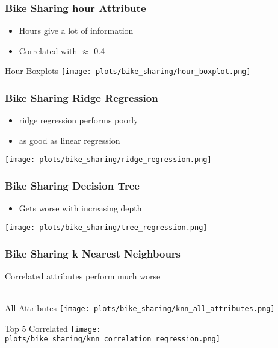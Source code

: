 \documentclass[aspectratio=169]{beamer}
\begin{document}
\begin{frame}
\frametitle{Bike Sharing hour Attribute}
\begin{minipage}{0.3\textwidth}
	\begin{itemize}
	\item Hours give a lot of information
	\item Correlated with $\approx$ 0.4
	\end{itemize}
\end{minipage}
\begin{minipage}{0.69\textwidth}
	\center Hour Boxplots
	\texttt{[image: plots/bike\_sharing/hour\_boxplot.png]}
\end{minipage}
\end{frame}

\begin{frame}{}
\frametitle{Bike Sharing Ridge Regression}
\begin{minipage}{0.3\textwidth}
\begin{itemize}
\item ridge regression performs poorly
\item as good as linear regression
\end{itemize}
\end{minipage}
\begin{minipage}{0.69\textwidth}
    \texttt{[image: plots/bike\_sharing/ridge\_regression.png]}
\end{minipage}
\end{frame}

\begin{frame}{}
\frametitle{Bike Sharing Decision Tree}
\begin{minipage}{0.3\textwidth}
\begin{itemize}
\item  Gets worse with increasing depth
\end{itemize}
\end{minipage}
\begin{minipage}{0.69\textwidth}
    \texttt{[image: plots/bike\_sharing/tree\_regression.png]}
\end{minipage}
\end{frame}

\begin{frame}{}
\frametitle{Bike Sharing k Nearest Neighbours}
\center Correlated attributes perform much worse\\~\\
\begin{minipage}{0.49\textwidth}
    \center All Attributes
    \texttt{[image: plots/bike\_sharing/knn\_all\_attributes.png]}
\end{minipage}
\begin{minipage}{0.49\textwidth}
    \center Top 5 Correlated
    \texttt{[image: plots/bike\_sharing/knn\_correlation\_regression.png]}
\end{minipage}
\end{frame}
\end{document}
